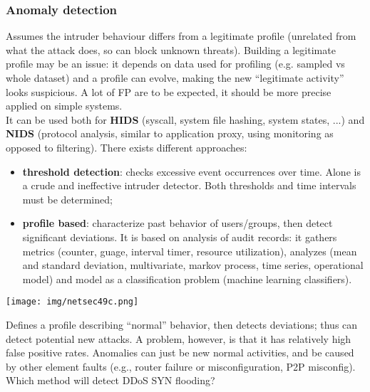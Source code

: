 \documentclass[a4paper, 10pt, titlepage]{article}
\begin{document}
\subsubsection*{Anomaly detection}
Assumes the intruder behaviour differs from a legitimate profile (unrelated from what the attack does, so can block unknown threats). Building a legitimate profile may be an issue: it depends on data used for profiling (e.g. sampled vs whole dataset) and a profile can evolve, making the new “legitimate activity” looks suspicious. A lot of FP are to be expected, it should be more precise applied on simple systems.\\
It can be used both for \textbf{HIDS} (syscall, system file hashing, system states, ...) and \textbf{NIDS} (protocol analysis, similar to application proxy, using monitoring as opposed to filtering). There exists different approaches:
\begin{itemize}
	\item \textbf{threshold detection}: checks excessive event occurrences over time. Alone is a crude and ineffective intruder detector. Both thresholds and time intervals must be determined;
	\item \textbf{profile based}: characterize past behavior of users/groups, then detect significant deviations. It is based on analysis of audit records: it gathers metrics (counter, guage, interval timer, resource utilization), analyzes (mean and standard deviation, multivariate, markov process, time series, operational model) and model as a classification problem (machine learning classifiers).
\end{itemize}
\begin{center}
	\texttt{[image: img/netsec49c.png]}
\end{center}
Defines a profile describing “normal” behavior, then detects deviations; thus can detect potential new attacks. A problem, however, is that it has relatively high false positive rates. Anomalies can just be new normal activities, and be caused by other element faults (e.g., router failure or misconfiguration, P2P misconfig). Which method will detect DDoS SYN flooding?
\end{document}
